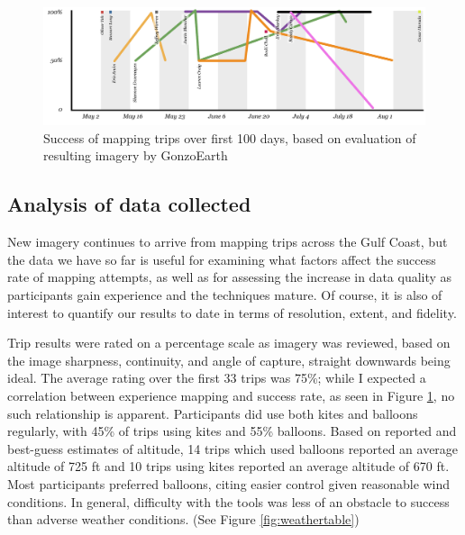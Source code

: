 \documentclass[11pt,oneside,notitlepage]{report}
\begin{document}
{{\begin{figure}[h]
  \label{fig:successmapping}
  \begin{center}
	\includegraphics[width=1\textwidth]{diagrams/trip-success-leaders.pdf}
	\caption{Success of mapping trips over first 100 days, based on evaluation of resulting imagery by GonzoEarth}
  \end{center}
\end{figure}

\subsection{Analysis of data collected}

New imagery continues to arrive from mapping trips across the Gulf Coast, but the data we have so far is useful for examining what factors affect the success rate of mapping attempts, as well as for assessing the increase in data quality as participants gain experience and the techniques mature. Of course, it is also of interest to quantify our results to date in terms of resolution, extent, and fidelity.  

Trip results were rated on a percentage scale as imagery was reviewed, based on the image sharpness, continuity, and angle of capture, straight downwards being ideal. The average rating over the first 33 trips was 75\%; while I expected a correlation between experience mapping and success rate, as seen in Figure \ref{fig:successmapping}, no such relationship is apparent. Participants did use both kites and balloons regularly, with 45\% of trips using kites and 55\% balloons. Based on reported and best-guess estimates of altitude, 14 trips which used balloons reported an average altitude of 725 ft and 10 trips using kites reported an average altitude of 670 ft. Most participants preferred balloons, citing easier control given reasonable wind conditions. In general, difficulty with the tools was less of an obstacle to success than adverse weather conditions. (See Figure \ref{fig:weathertable}) 

}}
\end{document}

